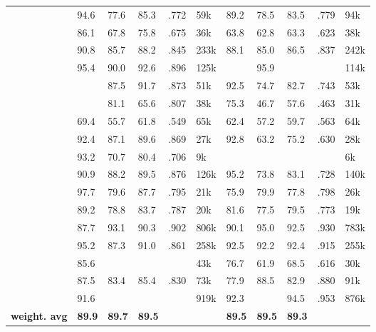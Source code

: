 {\begin{tabular}{@{}Xxxxxxxxxxx@{}}
    	     &	94.6    &	77.6		&	85.3		& .772 			&	59k		&	89.2		&	78.5		&	83.5		& .779 &	94k	\\
    	     &	86.1    &	67.8		&	75.8		& .675 			&	36k		&	63.8		&	62.8		&	63.3		& .623 &	38k	\\
    		     &	90.8    &	85.7		&	88.2		& .845 			&	233k	&	88.1		&	85.0		&	86.5		& .837 &	242k	\\
    		     &	95.4    &	90.0		&	92.6		& .896 			&	125k	&	&	95.9		&	&  &	114k	\\
    		     &&	87.5		&	91.7		& .873 			&	51k		&	92.5		&	74.7		&	82.7		& .743 &	53k	\\
    	 &&	81.1		&	65.6		& .807 			&	38k		&	75.3		&	46.7		&	57.6		& .463 &	31k	\\
    &	69.4	&	55.7		&	61.8		& .549 			&	65k		&	62.4		&	57.2		&	59.7		& .563 &	64k	\\
    		     &	92.4	&	87.1		&	89.6		& .869 			&	27k		&	92.8		&	63.2		&	75.2		& .630 &	28k	\\
    		     &	93.2	&	70.7		&	80.4		& .706 			&	9k		&	&	&	&  & 	6k	\\
    		     &	90.9	&	88.2		&	89.5		& .876 			&	126k	&	95.2		&	73.8		&	83.1		& .728 &	140k	\\
    	     &	97.7	&	79.6		&	87.7		& .795 			&	21k		&	75.9		&	79.9		&	77.8		& .798 &	26k	\\
    	     &	89.2	&	78.8		&	83.7		& .787 			&	20k		&	81.6		&	77.5		&	79.5		& .773 &	19k	\\
    	 &	87.7	&	93.1		&	90.3		& .902 			&	806k	&	90.1		&	95.0		&	92.5		& .930 &	783k	\\
    	 &	95.2	&	87.3		&	91.0		& .861 			&	258k	&	92.5		&	92.2		&	92.4		& .915 &	255k	\\
    	     &	85.6	&	&	&  	&	43k		&	76.7		&	61.9		&	68.5		& .616 &	30k	\\
    	 &	87.5	&	83.4		&	85.4		& .830 			&	73k		&	77.9		&	88.5		&	82.9		& .880 &	91k	\\
    		     &	91.6	&	&	&  	&	919k	&	92.3		&	&	94.5		& .953 &	876k	\\
    \addlinespace
    \textbf{weight. avg}	&\textbf{89.9}	&\textbf{89.7}	&\textbf{89.5}	& \textbf{} &	&\textbf{89.5}	&\textbf{89.5}	&\textbf{89.3}	& \textbf{} &		\\
    \cmidrule(lr){2-6}
    \cmidrule(l){7-11} 
    

\end{tabular}}
